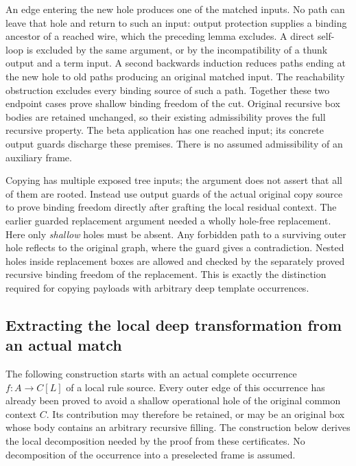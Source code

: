 An edge entering the new hole produces one of the matched inputs. No path
can leave that hole and return to such an input: output protection supplies
a binding ancestor of a reached wire, which the preceding lemma excludes.
A direct self-loop is excluded by the same argument, or by the incompatibility
of a thunk output and a term input. A second backwards induction reduces
paths ending at the new hole to old paths producing an original matched
input. The reachability obstruction excludes every binding source of such
a path. Together these two endpoint cases prove shallow binding freedom of
the cut. Original recursive box bodies are retained unchanged, so their
existing admissibility proves the full recursive property. The beta
application has one reached input; its concrete output guards discharge
these premises. There is no assumed admissibility of an auxiliary frame.
\par{}
\par{}

Copying has multiple exposed tree inputs; the argument does not assert that
all of them are rooted. Instead use output guards of the actual original
copy source to prove binding freedom directly after grafting the local
residual context. The earlier guarded replacement argument needed a wholly
hole-free replacement. Here only \emph{shallow} holes must be absent. Any
forbidden path to a surviving outer hole reflects to the original graph,
where the guard gives a contradiction. Nested holes inside replacement boxes
are allowed and checked by the separately proved recursive binding freedom
of the replacement. This is exactly the distinction required for copying
payloads with arbitrary deep template occurrences.

\subsection{Extracting the local deep transformation from an actual match}
The following construction starts with an actual complete occurrence
$f:A\to C[L]$ of a local rule source. Every outer edge of this occurrence
has already been proved to avoid a shallow operational hole of the original
common context $C$. Its contribution may therefore be retained, or may be
an original box whose body contains an arbitrary recursive filling. The
construction below derives the local decomposition needed by the proof from
these certificates. No decomposition of the occurrence into a preselected
frame is assumed.

